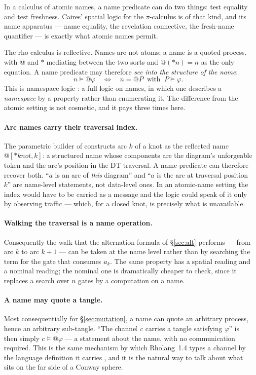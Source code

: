 \documentclass[11pt]{article}
\theoremstyle{definition}
\begin{document}
In a calculus of atomic names, a name predicate can do two things: test equality
and test freshness. Caires' spatial logic for the $\pi$-calculus \cite{caires} is
of that kind, and its name apparatus --- name equality, the revelation
connective, the fresh-name quantifier --- is exactly what atomic names permit.

The rho calculus is reflective. Names are not atoms; a name is a quoted process,
with $@$ and $*$ mediating between the two sorts and $@(*n) = n$ as the only
equation. A name predicate may therefore \emph{see into the structure of the
name}:
\[
n \models @\varphi
\quad\Longleftrightarrow\quad
n = @P \ \text{ with } \ P \models \varphi .
\]
This is namespace logic \cite{namespace}: a full logic on names, in which one
describes a \emph{namespace} by a property rather than enumerating it. The
difference from the atomic setting is not cosmetic, and it pays three times here.

\paragraph{Arc names carry their traversal index.}
The parametric builder of \cite[App.~A]{knots} constructs arc $k$ of a knot as the
reflected name $@[*\mathit{knot}, k]$: a structured name whose components are the
diagram's unforgeable token and the arc's position in the DT traversal. A name
predicate can therefore recover both. ``$a$ is an arc of \emph{this} diagram'' and
``$a$ is the arc at traversal position $k$'' are name-level statements, not
data-level ones. In an atomic-name setting the index would have to be carried as a
message and the logic could speak of it only by observing traffic --- which, for a
closed knot, is precisely what is unavailable.

\paragraph{Walking the traversal is a name operation.}
Consequently the walk that the alternation formula of \S\ref{sec:alt} performs ---
from arc $k$ to arc $k+1$ --- can be taken at the name level rather than by
searching the term for the gate that consumes $a_k$. The same property has a
spatial reading and a nominal reading; the nominal one is dramatically cheaper to
check, since it replaces a search over $n$ gates by a computation on a name.

\paragraph{A name may quote a tangle.}
Most consequentially for \S\ref{sec:mutation}, a name can quote an arbitrary
process, hence an arbitrary sub-tangle. ``The channel $c$ carries a tangle
satisfying $\varphi$'' is then simply $c \models @\varphi$ --- a statement about
the name, with no communication required. This is the same mechanism by which
Rholang~1.4 types a channel by the language definition it carries
\cite[\S9]{omnibus}, and it is the natural way to talk about what sits on the far
side of a Conway sphere.
\end{document}
